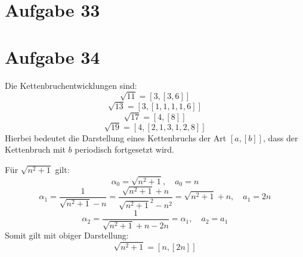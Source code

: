 \section*{Aufgabe 33}


\section*{Aufgabe 34}
Die Kettenbruchentwicklungen sind:
\[ \sqrt{11} = [3, [3, 6]] \]
\[ \sqrt{13} = [3, [1, 1, 1, 1, 6]] \]
\[ \sqrt{17} = [4, [8]] \]
\[ \sqrt{19} = [4, [2, 1, 3, 1, 2, 8]] \]
Hierbei bedeutet die Darstellung eines Kettenbruchs der Art $[a, [b]]$, dass
der Kettenbruch mit $b$ periodisch fortgesetzt wird.

Für $\sqrt{n^2 + 1}$ gilt:
\[ \alpha_0 = \sqrt{n^2 + 1}, \quad a_0 = n \]
\[ \alpha_1 = \frac{1}{\sqrt{n^2 + 1} - n} = \frac{\sqrt{n^2 + 1} + n}{{\sqrt{n^2 + 1}}^2 - n^2} = \sqrt{n^2 + 1} + n, \quad a_1 = 2n \]
\[ \alpha_2 = \frac{1}{\sqrt{n^2 + 1} + n - 2n} = \alpha_1, \quad a_2 = a_1 \]
Somit gilt mit obiger Darstellung:
\[ \sqrt{n^2 + 1} = [n, [2n]] \]
